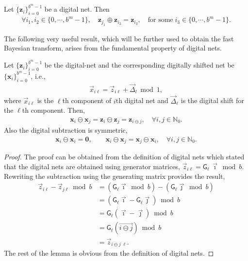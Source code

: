 \documentclass{svjour3}                     %
\newcommand{\bm}[1]{\boldsymbol{#1}}
\newcommand{\naturals}{\mathbb{N}}
\newcommand{\vx}{\bm{x}}
\newcommand{\vz}{\bm{z}}
\newcommand{\mG}{\mathsf{G}}
\begin{document}
Let $\{\vz_i\}_{i=0}^{b^m-1}$ be a digital net. Then
\begin{align*}
\forall i_1, i_2 \in \{0,\cdots,b^m-1\}, \quad \vz_{j_1} \oplus \vz_{i_2} = \vz_{i_3}, \quad \text{for some} \; i_3 \in \{0,\cdots,b^m-1\}.
\end{align*}

The following very useful result, which will be further used to obtain the fast Bayesian transform, arises from the fundamental property of digital nets.

\begin{lemma}
	\label{lemma:digital_net_prop}
	Let $\{\vz_i\}_{i=0}^{b^{m}-1}$ be the digital-net and the corresponding digitally shifted net be $\{\vx_i\}_{i=0}^{b^{m}-1}$, i.e.,
	\begin{align*}
	\vec{x}_{i \ell} = \vec{z}_{i \ell} + \vec{\Delta}_l \bmod 1,
	\end{align*}
	where $\vec{x}_{i \ell}$ is the $\ell$th component of $i$th digital net and $\vec{\Delta}_{\ell}$ is the digital shift for the $\ell$th component. 
	Then,
	\begin{align}
	\label{eqn:digital_shift_prop}
	\vx_i \ominus \vx_j = \vz_i \ominus \vz_j = \vz_{i \ominus j}, \quad \forall i,j \in \naturals_0. 
	\end{align}
	Also the digital subtraction is symmetric,
	\begin{align}
	\label{eqn:digital_net_symmetric_prop}
	\vx_i \ominus \vx_i = \boldsymbol{ 0}, \qquad 
	\vx_i \ominus \vx_j = \vx_j \ominus \vx_i, \quad \forall i,j \in \naturals_0.
	\end{align}
\end{lemma}

\begin{proof}
	
	The proof can be obtained from the definition of digital nets which stated that the digital nets are obtained using generator matrices, $\vec{z}_{i \ell} = \mG_{\ell} \, \vec{\imath} \bmod b$. Rewriting the subtraction using the generating matrix provides the result,
	\begin{align*}
	\vec{z}_{i \ell} - \vec{z}_{j\ell} \bmod b & = (\mG_{\ell} \vec{\imath} \bmod b) - (\mG_{\ell} \vec{\jmath} \bmod b) \\
	& = (\mG_{\ell} \vec{\imath} - \mG_{\ell} \vec{\jmath} ) \bmod b \\
	& = \mG_{\ell} (\vec{\imath} - \vec{\jmath} ) \bmod b \\
	& = \mG_{\ell} (\overrightarrow{i \ominus j} ) \bmod b \\
	& = \vec{z}_{i \ominus j \; {\ell}}.
	\end{align*}
	The rest of the lemma is obvious from the definition of digital nets.
\end{proof}
\end{document}
